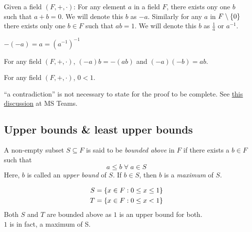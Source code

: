 \documentclass[12pt]{article}
\begin{document}
\begin{lem} \label{lem:unique inverses}
    Given a field $(F, +, \cdot)$: For any element $a$ in a field $F$, there exists ony one $b$ such that $a + b = 0$. We will denote this $b$ as $-a$. Similarly for any $a$ in $F \setminus \set{0}$ there exists only one $b \in F$ such that $ab = 1$. We will denote this $b$ as $\frac{1}{a}$ or $a^{-1}$.
\end{lem}

\begin{lem} \label{lem:inverse involution}
    $-(-a) = a = (a^{-1})^{-1}$
\end{lem}

\begin{lem} \label{lem:(-a)b=-(ab)}
    For any field $(F, +, \cdot)$, $(-a)b = -(ab)$ and $(-a)(-b) = ab$.
\end{lem}

\begin{thm} \label{thm:0<1}
    For any field $(F, +, \cdot)$, $0 < 1$.
\end{thm}

\begin{rem}
    ``a contradiction'' is not necessary to state for the proof to be complete. See \href{https://teams.microsoft.com/l/message/19:5PNDOetYK3gbPZWX5Muk\_KnaEXgulRmRNwNmAHA8dZ81@thread.tacv2/1666960265828?tenantId=6f15cd97-f6a7-41e3-b2c5-ad4193976476&groupId=9cf683b7-9233-4d97-a7eb-1dc0051039a7&parentMessageId=1666960265828&teamName=UM\%20101\%20October\%202022&channelName=General&createdTime=1666960265828&allowXTenantAccess=false}{this discussion} at MS Teams.
\end{rem}

\subsection{Upper bounds \& least upper bounds}

\begin{defn} \label{defn:bounded above}
    A non-empty subset $S \subseteq F$ is said to be \emph{bounded above} in $F$ if there exists a $b \in F$ such that \[
        a \leq b \;\forall\; a \in S
    \]
    Here, $b$ is called an \emph{upper bound} of $S$. If $b \in S$, then $b$ is a \emph{maximum} of $S$.
\end{defn}

\begin{example}
    \begin{align*}
        S &= \set{ x \in F : 0 \leq x \leq 1 } \\
        T &= \set{ x \in F : 0 \leq x < 1 }
    \end{align*}
    Both $S$ and $T$ are bounded above as $1$ is an upper bound for both. \\
    $1$ is in fact, a maximum of S.
\end{example}
\end{document}
